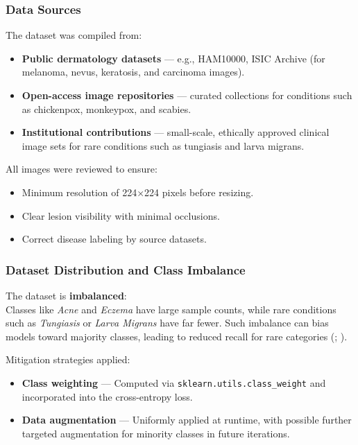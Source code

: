 \documentclass[
  12pt,
  oneside]{article}
\providecommand{\tightlist}{%
  \setlength{\itemsep}{0pt}\setlength{\parskip}{0pt}}
\begin{document}
\subsubsection{Data Sources}\label{data-sources}

The dataset was compiled from:

\begin{itemize}
\tightlist
\item
  \textbf{Public dermatology datasets} --- e.g., HAM10000, ISIC Archive
  (for melanoma, nevus, keratosis, and carcinoma images).
\item
  \textbf{Open-access image repositories} --- curated collections for
  conditions such as chickenpox, monkeypox, and scabies.
\item
  \textbf{Institutional contributions} --- small-scale, ethically
  approved clinical image sets for rare conditions such as tungiasis and
  larva migrans.
\end{itemize}

All images were reviewed to ensure:

\begin{itemize}
\tightlist
\item
  Minimum resolution of 224×224 pixels before resizing.
\item
  Clear lesion visibility with minimal occlusions.
\item
  Correct disease labeling by source datasets.
\end{itemize}

\subsubsection{Dataset Distribution and Class
Imbalance}\label{dataset-distribution-and-class-imbalance}

The dataset is \textbf{imbalanced}:\\
Classes like \emph{Acne} and \emph{Eczema} have large sample counts,
while rare conditions such as \emph{Tungiasis} or \emph{Larva Migrans}
have far fewer. Such imbalance can bias models toward majority classes,
leading to reduced recall for rare categories
(;
).

Mitigation strategies applied:

\begin{itemize}
\tightlist
\item
  \textbf{Class weighting} --- Computed via
  \texttt{sklearn.utils.class\_weight} and incorporated into the
  cross-entropy loss.
\item
  \textbf{Data augmentation} --- Uniformly applied at runtime, with
  possible further targeted augmentation for minority classes in future
  iterations.
\end{itemize}
\end{document}
